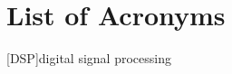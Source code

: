\documentclass[reqno,onecolumn,oneside]{paper}
\theoremstyle{plain}
\theoremstyle{definition}
\theoremstyle{remark}
\numberwithin{theorem}{section}
\numberwithin{claim}{section}
\numberwithin{equation}{section}
\numberwithin{conjecture}{section}
\newcommand{\<}{\ensuremath{\langle}}
\renewcommand{\>}{\ensuremath{\rangle}}
\begin{document}
% 

% 

% 

% 

%
%


%
%
%
%

%

%


%

%
%
%

\section*{List of Acronyms}
\begin{acronym}
[DSP]{digital signal processing}
\end{acronym}




\end{document}
